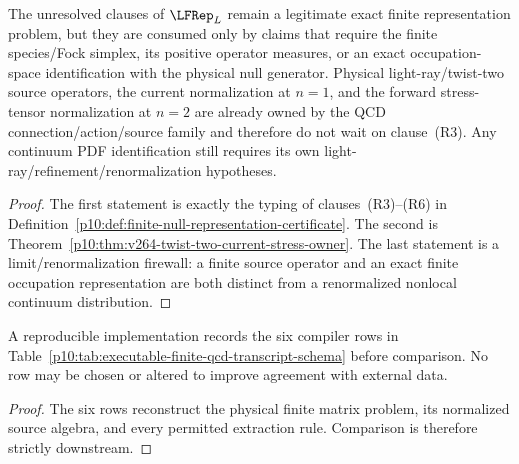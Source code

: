 \documentclass[12pt,a4paper]{article}
\begin{document}
\begin{corollary}
\label{p10:cor:v264-lfrep-optional-finite-readout-scope}
The unresolved clauses of \(\LFRep_L\) remain a legitimate exact finite representation problem, but they are consumed only by claims that require the finite species/Fock simplex, its positive operator measures, or an exact occupation-space identification with the physical null generator.  Physical light-ray/twist-two source operators, the current normalization at \(n=1\), and the forward stress-tensor normalization at \(n=2\) are already owned by the QCD connection/action/source family and therefore do not wait on clause~\textnormal{(R3)}.  Any continuum PDF identification still requires its own light-ray/refinement/renormalization hypotheses.
\end{corollary}
\begin{proof}
The first statement is exactly the typing of clauses~\textnormal{(R3)--(R6)} in Definition~\ref{p10:def:finite-null-representation-certificate}.  The second is Theorem~\ref{p10:thm:v264-twist-two-current-stress-owner}.  The last statement is a limit/renormalization firewall: a finite source operator and an exact finite occupation representation are both distinct from a renormalized nonlocal continuum distribution.
\end{proof}

\begin{proposition}
\label{p10:prop:executable-native-qcd-protocol}
A reproducible implementation records the six compiler rows in
Table~\ref{p10:tab:executable-finite-qcd-transcript-schema} before comparison.
No row may be chosen or altered to improve agreement with external data.
\end{proposition}
\begin{proof}
The six rows reconstruct the physical finite matrix problem, its normalized
source algebra, and every permitted extraction rule.  Comparison is therefore
strictly downstream.
\end{proof}
\end{document}
